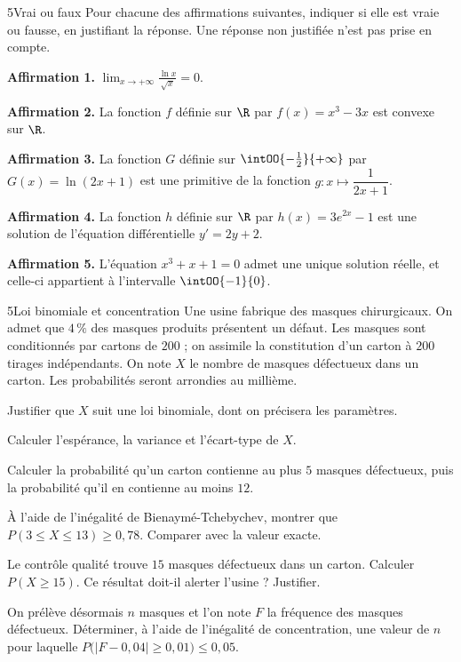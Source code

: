 

\begin{exoBac}{5}{Vrai ou faux}
Pour chacune des affirmations suivantes, indiquer si elle est vraie ou fausse, en justifiant la réponse. Une réponse non justifiée
n'est pas prise en compte.
\begin{questions}
  \item \textbf{Affirmation 1.} $\displaystyle\lim_{x\to+\infty}\frac{\ln x}{\sqrt x}=0$.
  \item \textbf{Affirmation 2.} La fonction $f$ définie sur $\R$ par $f(x)=x^{3}-3x$ est convexe sur $\R$.
  \item \textbf{Affirmation 3.} La fonction $G$ définie sur $\intOO{-\frac12}{+\infty}$ par $G(x)=\ln(2x+1)$ est une primitive de la
    fonction $g:x\mapsto\dfrac{1}{2x+1}$.
  \item \textbf{Affirmation 4.} La fonction $h$ définie sur $\R$ par $h(x)=3e^{2x}-1$ est une solution de l'équation différentielle
    $y'=2y+2$.
  \item \textbf{Affirmation 5.} L'équation $x^{3}+x+1=0$ admet une unique solution réelle, et celle-ci appartient à l'intervalle
    $\intOO{-1}{0}$.
\end{questions}
\end{exoBac}

\begin{exoBac}{5}{Loi binomiale et concentration}
Une usine fabrique des masques chirurgicaux. On admet que $4\,\%$ des masques produits présentent un défaut. Les masques sont conditionnés
par cartons de $200$ ; on assimile la constitution d'un carton à $200$ tirages indépendants. On note $X$ le nombre de masques
défectueux dans un carton. Les probabilités seront arrondies au millième.
\begin{questions}
  \item Justifier que $X$ suit une loi binomiale, dont on précisera les paramètres.
  \item Calculer l'espérance, la variance et l'écart-type de $X$.
  \item Calculer la probabilité qu'un carton contienne au plus $5$ masques défectueux, puis la probabilité qu'il en contienne au
    moins $12$.
  \item À l'aide de l'inégalité de Bienaymé-Tchebychev, montrer que $P(3\leq X\leq13)\geq0{,}78$. Comparer avec la valeur exacte.
  \item Le contrôle qualité trouve $15$ masques défectueux dans un carton. Calculer $P(X\geq15)$. Ce résultat doit-il alerter
    l'usine ? Justifier.
  \item On prélève désormais $n$ masques et l'on note $F$ la fréquence des masques défectueux. Déterminer, à l'aide de l'inégalité de
    concentration, une valeur de $n$ pour laquelle $P\big(|F-0{,}04|\geq0{,}01\big)\leq0{,}05$.
\end{questions}
\end{exoBac}

